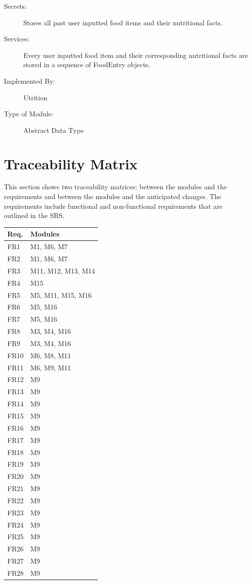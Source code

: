 \documentclass[12pt, titlepage]{article}
\begin{document}
\begin{description}
	\item[Secrets:]Stores all past user inputted food items and their 
	nutritional facts.
	\item[Services:]Every user inputted food item and their corresponding 
	nutritional facts are stored in a sequence of FoodEntry objects.
	\item[Implemented By:] Utrition
	\item[Type of Module:] Abstract Data Type
\end{description}

\section{Traceability Matrix} \label{SecTM}

This section shows two traceability matrices: between the modules and the
requirements and between the modules and the anticipated changes. The requirements include functional and non-functional requirements that are outlined in the SRS.

\begin{table}[H]
\centering
\begin{tabular}{p{} p{}}
\toprule
\textbf{Req.} & \textbf{Modules}\\
\midrule
FR1 & M1, M6, M7\\
FR2 & M1, M6, M7\\
FR3 & M11, M12, M13, M14\\
FR4 & M15\\
FR5 & M5, M11, M15, M16\\
FR6 & M5, M16\\
FR7 & M5, M16\\
FR8 & M3, M4, M16 \\
FR9 & M3, M4, M16 \\
FR10 & M6, M8, M11\\
FR11 & M6, M9, M11 \\
FR12 & M9\\
FR13 & M9\\
FR14 & M9\\
FR15 & M9\\
FR16 & M9\\
FR17 & M9\\
FR18 & M9\\
FR19 & M9\\
FR20 & M9\\
FR21 & M9\\
FR22 & M9\\
FR23 & M9\\
FR24 & M9\\
FR25 & M9\\
FR26 & M9\\
FR27 & M9\\
FR28 & M9\\
\bottomrule
\end{tabular}
\end{table}
\end{document}
